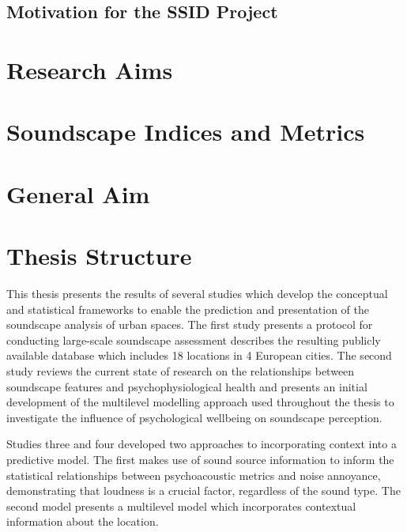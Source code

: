 \subsection{Motivation for the SSID Project}

\section{Research Aims}

\section{Soundscape Indices and Metrics}

\section{General Aim}

\section{Thesis Structure}

This thesis presents the results of several studies which develop the conceptual and statistical frameworks to enable the prediction and presentation of the soundscape analysis of urban spaces. The first study presents a protocol for conducting large-scale soundscape assessment describes the resulting publicly available database which includes 18 locations in 4 European cities. The second study reviews the current state of research on the relationships between soundscape features and psychophysiological health and presents an initial development of the multilevel modelling approach used throughout the thesis to investigate the influence of psychological wellbeing on soundscape perception.

Studies three and four developed two approaches to incorporating context into a predictive model. The first makes use of sound source information to inform the statistical relationships between psychoacoustic metrics and noise annoyance, demonstrating that loudness is a crucial factor, regardless of the sound type. The second model presents a multilevel model which incorporates contextual information about the location.
